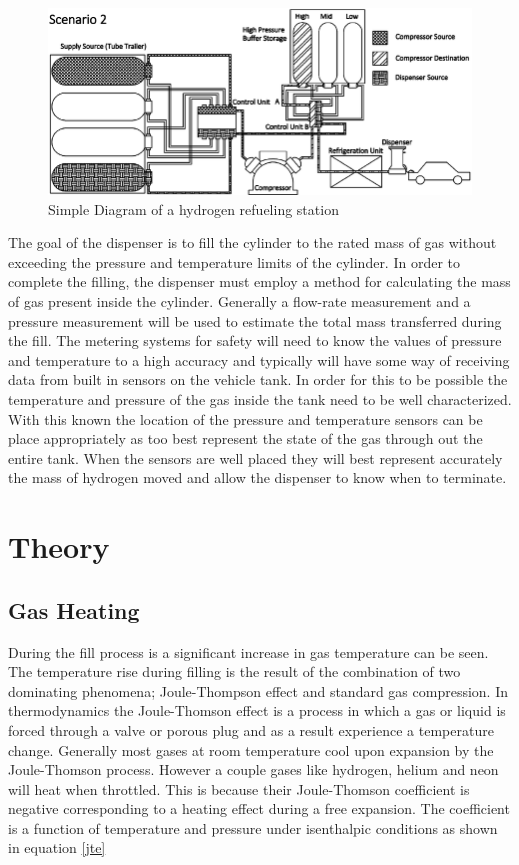 \documentclass[paper=a4, fontsize=11pt, abstract=on]{scrartcl}
\numberwithin{equation}{section}		%
\numberwithin{figure}{section}			%
\numberwithin{table}{section}				%
\begin{document}
\begin{figure}[H]
\centering
\includegraphics[width=0.8\linewidth]{station}
\caption{Simple Diagram of a hydrogen refueling station}
\label{station}
\end{figure}


 The goal of the dispenser is to fill the cylinder to the rated mass of gas without exceeding the pressure and temperature limits of the cylinder. In order to complete the filling, the dispenser must employ a method for calculating the mass of gas present inside the cylinder. Generally a flow-rate measurement and a pressure measurement will be used to estimate the total mass transferred during the fill. The metering systems for safety will need to know the values of pressure and temperature to a high accuracy and typically will have some way of receiving data from built in sensors on the vehicle tank. In order for this to be possible the temperature and pressure of the gas inside the tank need to be well characterized. With this known the location of the pressure and temperature sensors can be place appropriately as too best represent the state of the gas through out the entire tank. When the sensors are well placed they will best represent accurately the mass of hydrogen moved and allow the dispenser to know when to terminate.



\section{Theory}

\subsection{Gas Heating}
During the fill process is a significant increase in gas temperature can be seen. The temperature rise during filling is the result of the combination of two dominating phenomena; Joule-Thompson effect and standard gas compression. In thermodynamics the Joule-Thomson effect is a process in which a gas or liquid is forced through a valve or porous plug and as a result experience a temperature change. Generally most gases at room temperature cool upon expansion by the Joule-Thomson process. However a couple gases like hydrogen, helium and neon will heat when throttled. This is because their Joule-Thomson coefficient is negative corresponding to a heating effect during a free expansion. The coefficient is a function of temperature and pressure under isenthalpic conditions as shown in equation \ref{jte}
\end{document}
